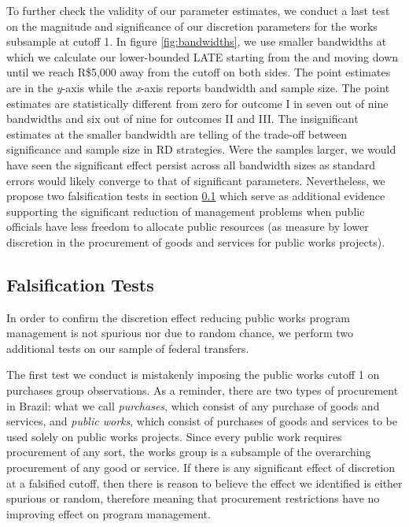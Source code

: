 \documentclass[11pt]{article}
\begin{document}
To further check the validity of our parameter estimates, we conduct a last test on the magnitude and significance of our discretion parameters for the works subsample at cutoff 1. In figure \ref{fig:bandwidths}, we use smaller bandwidths at which we calculate our lower-bounded LATE starting from the \citet{CalonicoOptimalDataDrivenRegression2015} and moving down until we reach R\$5,000 away from the cutoff on both sides. The point estimates are in the \emph{y}-axis while the \emph{x}-axis reports bandwidth and sample size. The point estimates are statistically different from zero for outcome I in seven out of nine bandwidths and six out of nine for outcomes II and III. The insignificant estimates at the smaller bandwidth are telling of the trade-off between significance and sample size in RD strategies. Were the samples larger, we would have seen the significant effect persist across all bandwidth sizes as standard errors would likely converge to that of significant parameters. Nevertheless, we propose two falsification tests in section \ref{subsec:discussion} which serve as additional evidence supporting the significant reduction of management problems when public officials have less freedom to allocate public resources (as measure by lower discretion in the procurement of goods and services for public works projects).

\subsection{Falsification Tests} \label{subsec:discussion}

In order to confirm the discretion effect reducing public works program management is not spurious nor due to random chance, we perform two additional tests on our sample of federal transfers.

The first test we conduct is mistakenly imposing the public works cutoff 1 on  purchases group observations. As a reminder, there are two types of procurement in Brazil: what we call \emph{purchases}, which consist of any purchase of goods and services, and \emph{public works}, which consist of purchases of goods and services to be used solely on public works projects. Since every public work requires procurement of any sort, the works group is a subsample of the overarching procurement of any good or service. If there is any significant effect of discretion at a falsified cutoff, then there is reason to believe the effect we identified is either spurious or random, therefore meaning that procurement restrictions have no improving effect on program management.
\end{document}
